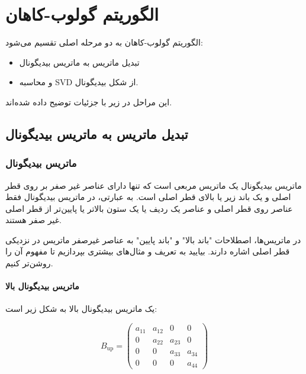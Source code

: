 \section{الگوریتم گولوب-کاهان}
الگوریتم گولوب-کاهان به دو مرحله اصلی تقسیم می‌شود:

\begin{itemize}
    \item تبدیل ماتریس به ماتریس بیدیگونال 

    \item و محاسبه SVD از شکل بیدیگونال.

\end{itemize}






این مراحل در زیر با جزئیات توضیح داده شده‌اند.

\subsection{تبدیل ماتریس به ماتریس بیدیگونال}

\subsubsection{ماتریس بیدیگونال}


ماتریس بیدیگونال  یک ماتریس مربعی است که تنها دارای عناصر غیر صفر بر روی قطر اصلی و یک باند زیر یا بالای قطر اصلی است. به عبارتی، در ماتریس بیدیگونال فقط عناصر روی قطر اصلی و عناصر یک ردیف یا یک ستون بالاتر یا پایین‌تر از قطر اصلی غیر صفر هستند.


در ماتریس‌ها، اصطلاحات "باند بالا" و "باند پایین" به عناصر غیرصفر ماتریس در نزدیکی قطر اصلی اشاره دارند. بیایید به تعریف و مثال‌های بیشتری بپردازیم تا مفهوم آن را روشن‌تر کنیم.

\paragraph{ماتریس بیدیگونال بالا}



یک ماتریس بیدیگونال بالا به شکل زیر است:


\[
B_{\text{up}} = \begin{pmatrix}
a_{11} & a_{12} & 0 & 0 \\
0 & a_{22} & a_{23} & 0 \\
0 & 0 & a_{33} & a_{34} \\
0 & 0 & 0 & a_{44}
\end{pmatrix}
\]

